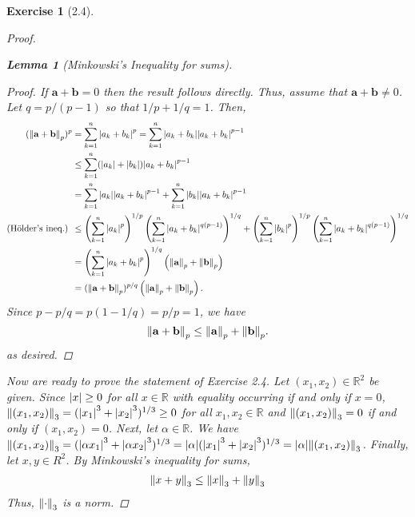 \documentclass[11pt]{article}
\newtheorem{lemma}[theorem]{Lemma}
\newtheorem{exercise}{Exercise}
\newcommand*{\myproofname}{Proof}
\newenvironment{subproof}[1][\myproofname]{\begin{proof}[#1]\renewcommand*{\qedsymbol}{$\mathbin{/\mkern-6mu/}$}}{\end{proof}}
\newcommand{\R}{\mathbb{R}}
\newcommand{\lp}{\left(}
\newcommand{\rp}{\right)}
\begin{document}
\begin{exercise}[2.4]
\begin{proof}
\begin{lemma}[Minkowski's Inequality for sums]
			\begin{subproof}
				If $\mathbf{a} + \mathbf{b} = 0$ then the result follows directly. Thus, assume that $\mathbf{a} + \mathbf{b} \neq 0$. Let $q = p/(p-1)$ so that $1/p + 1/q = 1$. Then,
				\begin{align*}
				(\norm{\mathbf{a} + \mathbf{b}}_p)^p
				&= \sum^n_{k=1}\abs{a_k + b_k}^p = \sum^n_{k=1}\abs{a_k + b_k}\abs{a_k + b_k}^{p-1} \\
				&\leq  \sum^n_{k=1}(\abs{a_k} + \abs{b_k})\abs{a_k + b_k}^{p-1} \\
				&=  \sum^n_{k=1}\abs{a_k}\abs{a_k + b_k}^{p-1} + \sum^n_{k=1}\abs{b_k}\abs{a_k + b_k}^{p-1} \\
				\mbox{(H\"{o}lder's ineq.) } &\leq \lp \sum^n_{k=1}\abs{a_k}^p \rp^{1/p}\lp \sum^n_{k=1}\abs{a_k + b_k}^{q(p-1)} \rp^{1/q} + \lp \sum^n_{k=1}\abs{b_k}^p \rp^{1/p}\lp \sum^n_{k=1}\abs{a_k + b_k}^{q(p-1)} \rp^{1/q} \\
				&=  \lp \sum^n_{k=1}\abs{a_k + b_k}^{p} \rp^{1/q} 
				\lp \norm{\mathbf{a}}_p + \norm{\mathbf{b}}_p \rp \\
				&= (\norm{\mathbf{a} + \mathbf{b}}_p)^{p/q}\lp \norm{\mathbf{a}}_p + \norm{\mathbf{b}}_p \rp.
				\end{align*}
				Since $p - p/q = p(1-1/q) = p/p = 1$, we have
				\begin{equation*}
				\norm{\mathbf{a} + \mathbf{b}}_p \leq \norm{\mathbf{a}}_p + \norm{\mathbf{b}}_p .
				\end{equation*}
				as desired.
			\end{subproof}
		\end{lemma}
		
		
		
		Now are ready to prove the statement of Exercise 2.4. Let $(x_1,x_2) \in \R^2$ be given. Since $\abs{x} \geq 0$ for all $x \in \R$ with equality occurring if and only if $x=0$, $\norm{(x_1,x_2)}_3 = (\abs{x_1}^3 + \abs{x_2}^3)^{1/3} \geq 0$ for all $x_1,x_2\in \R$ and $\norm{(x_1,x_2)}_3 = 0$ if and only if $(x_1,x_2) = 0$. Next, let $\alpha\in \R$. We have $\norm{(x_1,x_2)}_3 = (\abs{\alpha x_1}^3 + \abs{\alpha x_2}^3)^{1/3} = \abs{\alpha}(\abs{x_1}^3 + \abs{x_2}^3)^{1/3} = \abs{\alpha}\norm{(x_1,x_2)}_3$. Finally, let $x,y\in R^2$. By Minkowski's inequality for sums, 
			\begin{align*}
			\norm{x+y}_3 \leq \norm{x}_3 + \norm{y}_3
			\end{align*}
		Thus, $\norm{\cdot}_3$ is a norm.
	\end{proof}
\end{exercise}
\end{document}
